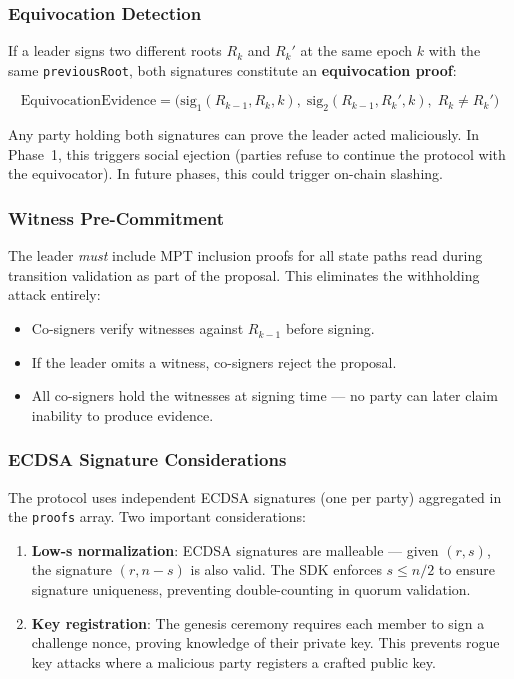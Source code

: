 \documentclass[11pt,a4paper]{article}
\begin{document}
\subsubsection{Equivocation Detection}

If a leader signs two different roots $R_k$ and $R_k'$ at the same epoch $k$
with the same \texttt{previousRoot}, both signatures constitute an
\textbf{equivocation proof}:

\[
  \text{EquivocationEvidence} = \big(
    \text{sig}_1(R_{k-1}, R_k, k),\;
    \text{sig}_2(R_{k-1}, R_k', k),\;
    R_k \neq R_k'
  \big)
\]

Any party holding both signatures can prove the leader acted maliciously.
In Phase~1, this triggers social ejection (parties refuse to continue the
protocol with the equivocator). In future phases, this could trigger
on-chain slashing.

\subsubsection{Witness Pre-Commitment}

The leader \emph{must} include MPT inclusion proofs for all state paths read
during transition validation as part of the proposal. This eliminates the
withholding attack entirely:

\begin{itemize}[nosep]
  \item Co-signers verify witnesses against $R_{k-1}$ before signing.
  \item If the leader omits a witness, co-signers reject the proposal.
  \item All co-signers hold the witnesses at signing time --- no party can
    later claim inability to produce evidence.
\end{itemize}

\subsubsection{ECDSA Signature Considerations}

The protocol uses independent ECDSA signatures (one per party) aggregated
in the \texttt{proofs} array. Two important considerations:

\begin{enumerate}[nosep]
  \item \textbf{Low-s normalization}: ECDSA signatures are malleable --- given
    $(r, s)$, the signature $(r, n-s)$ is also valid. The SDK enforces
    $s \leq n/2$ to ensure signature uniqueness, preventing double-counting
    in quorum validation.
  \item \textbf{Key registration}: The genesis ceremony requires each member
    to sign a challenge nonce, proving knowledge of their private key. This
    prevents rogue key attacks where a malicious party registers a crafted
    public key.
\end{enumerate}
\end{document}

